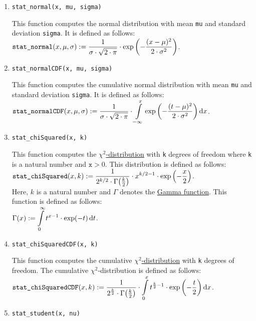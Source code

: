 	\begin{enumerate}
		\item \texttt{stat\_normal(x, mu, sigma)}

			This function computes the normal distribution with mean \texttt{mu} and standard deviation
			\texttt{sigma}.  It is defined as follows:
			\\[0.2cm]
			\hspace*{1.3cm}
			$\displaystyle \texttt{stat\_normal}(x, \mu, \sigma) :=
			\frac{1}{\sigma \cdot \sqrt{2 \cdot \pi}} \cdot \exp\left(-\frac{(x-\mu)^2}{2 \cdot \sigma^2}\right)
			$.
		\item \texttt{stat\_normalCDF(x, mu, sigma)}

			This function computes the cumulative normal distribution with mean \texttt{mu} and standard deviation
			\texttt{sigma}.  It is defined as follows:
			\\[0.2cm]
			\hspace*{1.3cm}
			$\displaystyle \texttt{stat\_normalCDF}(x, \mu, \sigma) :=
			\frac{1}{\sigma \cdot \sqrt{2 \cdot \pi}} \cdot 
			\int\limits_{-\infty}^x \exp\left(-\frac{(t-\mu)^2}{2 \cdot \sigma^2}\right) \mathrm{d}x
			$.
		\item \texttt{stat\_chiSquared(x, k)}
		 
			This function computes the
			\href{https://en.wikipedia.org/wiki/Chi-squared_distribution}{$\chi^2$-distribution}
			with \texttt{k} degrees of freedom where \texttt{k} is a natural number and $\texttt{x} > 0$.
			This distribution is defined as follows:
			\\[0.2cm]
			\hspace*{1.3cm}
			$\displaystyle \texttt{stat\_chiSquared}(x, k) :=
			\frac{1}{2^{k/2} \cdot \Gamma\bigl(\frac{k}{2}\bigr)} \cdot x^{k/2 - 1} \cdot \exp\left(-\frac{x}{2}\right)
			$.
			\\[0.2cm]
			Here, $k$ is a natural number and $\Gamma$ denotes the \href{https://en.wikipedia.org/wiki/Gamma_function}{Gamma function}.
			This function is defined as follows:
			\\[0.2cm]
			\hspace*{1.3cm}
			$\displaystyle \Gamma(x) := \int\limits_0^{\infty} t^{x-1} \cdot \exp(-t)\, \mathrm{d}t$.
		\item \texttt{stat\_chiSquaredCDF(x, k)}
		 
			This function computes the cumulative
			\href{https://en.wikipedia.org/wiki/Chi-squared_distribution}{$\chi^2$-distribution}
			with \texttt{k} degrees of freedom.  The cumulative $\chi^2$-distribution is defined as follows:
			\\[0.2cm]
			\hspace*{1.3cm}
			$\displaystyle \texttt{stat\_chiSquaredCDF}(x, k) :=
			\frac{1}{2^{\frac{k}{2}} \cdot \Gamma\bigl(\frac{k}{2}\bigr)} \cdot 
			\int\limits_{0}^x t^{\frac{k}{2} - 1} \cdot \exp\left(-\frac{t}{2}\right) \mathrm{d}x
			$.
		\item \texttt{stat\_student(x, nu)}


\end{enumerate}
